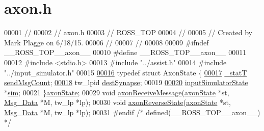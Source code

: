 \hypertarget{axon_8h_source}{}\section{axon.\+h}
\label{axon_8h_source}

\begin{DoxyCode}
00001 \textcolor{comment}{//}
00002 \textcolor{comment}{//  axon.h}
00003 \textcolor{comment}{//  ROSS\_TOP}
00004 \textcolor{comment}{//}
00005 \textcolor{comment}{//  Created by Mark Plagge on 6/18/15.}
00006 \textcolor{comment}{//}
00007 \textcolor{comment}{//}
00008 
00009 \textcolor{preprocessor}{#ifndef \_\_ROSS\_TOP\_\_axon\_\_}
00010 \textcolor{preprocessor}{#define \_\_ROSS\_TOP\_\_axon\_\_}
00011 
00012 \textcolor{preprocessor}{#include <stdio.h>}
00013 \textcolor{preprocessor}{#include "../assist.h"}
00014 \textcolor{preprocessor}{#include "../input\_simulator.h"}
00015 
\hypertarget{axon_8h_source_l00016}{}\hyperlink{structaxon_state}{00016} \textcolor{keyword}{typedef} \textcolor{keyword}{struct }AxonState \{
\hypertarget{axon_8h_source_l00017}{}\hyperlink{structaxon_state_a217ba44fb923dc4dc62bb73b14e61517}{00017}     \hyperlink{assist_8h_ad77e6fc5a9b03d46e7c97b7c4b92e89f}{\_statT} \hyperlink{structaxon_state_a217ba44fb923dc4dc62bb73b14e61517}{sendMsgCount};
\hypertarget{axon_8h_source_l00018}{}\hyperlink{structaxon_state_a665999819b255f36d756f17b85bc9a03}{00018}     tw\_lpid \hyperlink{structaxon_state_a665999819b255f36d756f17b85bc9a03}{destSynapse};
00019 
\hypertarget{axon_8h_source_l00020}{}\hyperlink{structaxon_state_ad1d67487729ff78dd3f00885184b1ef3}{00020}     \hyperlink{structinput_simulator_state}{inputSimulatorState} *\hyperlink{structaxon_state_ad1d67487729ff78dd3f00885184b1ef3}{sim};
00021 \}\hyperlink{structaxon_state}{axonState};
00029 \textcolor{keywordtype}{void} \hyperlink{axon_8h_ab136d88cfbbb1e9f0f3687908dd54851}{axonReceiveMessage}(\hyperlink{structaxon_state}{axonState} *st, \hyperlink{struct_msg___data}{Msg\_Data} *M, tw\_lp *lp);
00030 \textcolor{keywordtype}{void} \hyperlink{axon_8h_a4540abe1d7c57cae5b0ff088d3d47fd1}{axonReverseState}(\hyperlink{structaxon_state}{axonState} *st, \hyperlink{struct_msg___data}{Msg\_Data} *M, tw\_lp *lp);
00031 \textcolor{preprocessor}{#endif }\textcolor{comment}{/* defined(\_\_ROSS\_TOP\_\_axon\_\_) */}\textcolor{preprocessor}{}
\end{DoxyCode}
